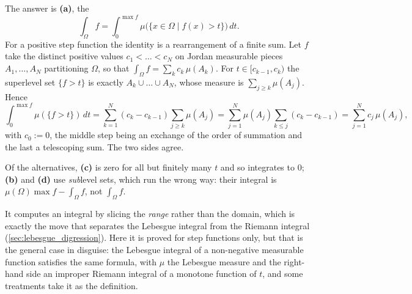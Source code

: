 \begin{exercisesolution}
\label{sol:kobel_layer_cake}
The answer is \textbf{(a)}, the 
\[\int_\Omega f = \int_0^{\max f}\mu\big(\{x \in \Omega \mid f(x) > t\}\big)\,dt .\]
For a positive step function the identity is a rearrangement of a finite sum. Let $f$ take the
distinct positive values $c_1 < \dots < c_N$ on Jordan measurable pieces $A_1,\dots,A_N$
partitioning $\Omega$, so that $\int_\Omega f = \sum_k c_k\,\mu(A_k)$. For $t \in
[c_{k-1},c_k)$ the superlevel set $\{f > t\}$ is exactly $A_k \cup \dots \cup A_N$, whose measure
is $\sum_{j \ge k}\mu(A_j)$. Hence
\[\int_0^{\max f}\mu(\{f>t\})\,dt
  = \sum_{k=1}^{N}(c_k - c_{k-1})\sum_{j\ge k}\mu(A_j)
  = \sum_{j=1}^{N}\mu(A_j)\sum_{k\le j}(c_k-c_{k-1})
  = \sum_{j=1}^N c_j\,\mu(A_j),\]
with $c_0 := 0$, the middle step being an exchange of the order of summation and the last a
telescoping sum. The two sides agree.

Of the alternatives, \textbf{(c)} is zero for all but finitely many $t$ and so integrates to $0$;
\textbf{(b)} and \textbf{(d)} use \emph{sub}level sets, which run the wrong way: their integral
is $\mu(\Omega)\max f - \int_\Omega f$, not $\int_\Omega f$.
\begin{remark}
It computes an integral by slicing the \emph{range} rather than the domain, which is exactly the
move that separates the Lebesgue integral from the Riemann integral
(\cref{sec:lebesgue_digression}). Here it is proved for step functions only, but that is the
general case in disguise: the Lebesgue integral of a non-negative measurable function satisfies
the same formula, with $\mu$ the Lebesgue measure and the right-hand side an improper Riemann
integral of a monotone function of $t$, and some treatments take it as the definition.
\end{remark}
\end{exercisesolution}
